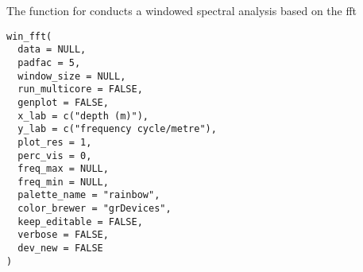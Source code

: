\documentclass[a4paper]{book}
\begin{document}
%
\begin{Description}
The  function for conducts a windowed spectral analysis based on the fft
\end{Description}
%
\begin{Usage}
\begin{verbatim}
win_fft(
  data = NULL,
  padfac = 5,
  window_size = NULL,
  run_multicore = FALSE,
  genplot = FALSE,
  x_lab = c("depth (m)"),
  y_lab = c("frequency cycle/metre"),
  plot_res = 1,
  perc_vis = 0,
  freq_max = NULL,
  freq_min = NULL,
  palette_name = "rainbow",
  color_brewer = "grDevices",
  keep_editable = FALSE,
  verbose = FALSE,
  dev_new = FALSE
)
\end{verbatim}
\end{Usage}
%
\end{document}
